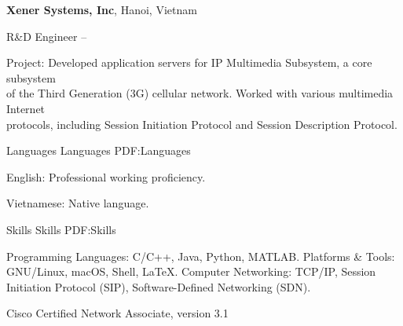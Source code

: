 \documentclass[letterpaper,MMMyyyy,nonstopmode]{simpleresumecv}
\begin{document}
\begin{Body}
\BigGap

\Entry
{\textbf{Xener Systems, Inc}}, Hanoi, Vietnam

\Gap
\BulletItem
R\&D Engineer
\hfill
{} -- 
\begin{Detail}
\SubBulletItem
Project: Developed application servers for IP Multimedia Subsystem, a core subsystem \\
of the Third Generation (3G) cellular network. Worked with various multimedia Internet \\
protocols, including Session Initiation Protocol and Session Description Protocol. 
\end{Detail}


\Section
{Languages}
{Languages}
{PDF:Languages}

\BulletItem
English: Professional working proficiency.

\Gap
\BulletItem
Vietnamese: Native language.



\Section
{Skills}
{Skills}
{PDF:Skills}

\Entry
\BulletItem
Programming Languages: C/C++, Java, Python, MATLAB.
\BulletItem
Platforms \& Tools: GNU/Linux, macOS, Shell, {\LaTeX}.
\BulletItem
Computer Networking: TCP/IP, Session Initiation Protocol (SIP), 
Software-Defined Networking (SDN).




\Entry
\BulletItem Cisco Certified Network Associate, version 3.1
\hfill {}







\end{Body}
\end{document}
